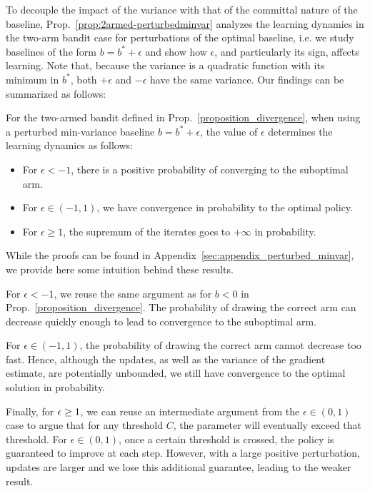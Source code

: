 To decouple the impact of the variance with that of the committal nature of the baseline, Prop.~\ref{prop:2armed-perturbedminvar} analyzes the learning dynamics in the two-arm bandit case for perturbations of the optimal baseline, i.e. we study baselines of the form $b = b^* + \epsilon$ and show how $\epsilon$, and particularly its sign, affects learning. Note that, because the variance is a quadratic function with its minimum in $b^*$, both $+\epsilon$ and $-\epsilon$ have the same variance. Our findings can be summarized as follows:
\begin{proposition}
    \label{prop:2armed-perturbedminvar}
    For the two-armed bandit defined in Prop.~\ref{proposition_divergence}, when using a perturbed min-variance baseline $b = b^* + \epsilon$, the value of $\epsilon$ determines the learning dynamics as follows:
    \begin{itemize}%
        \item For $\epsilon < -1$, there is a positive probability of converging to the suboptimal arm.
        \item For $\epsilon \in (-1, 1)$, we have convergence in probability to the optimal policy.
        \item For $\epsilon \ge 1$, the supremum of the iterates goes to $+\infty$ in probability.
    \end{itemize}
\end{proposition}


While the proofs can be found in Appendix~\ref{sec:appendix_perturbed_minvar}, we provide here some intuition behind these results.

For $\epsilon < -1$, we reuse the same argument as for $b<0$ in Prop.~\ref{proposition_divergence}. The probability of drawing the correct arm can decrease quickly enough to lead to convergence to the suboptimal arm.

For $\epsilon \in (-1,1)$, the probability of drawing the correct arm cannot decrease too fast. Hence, although the updates, as well as the variance of the gradient estimate, are potentially unbounded, we still have convergence to the optimal solution in probability.

Finally, for ${\epsilon} \ge 1$, we can reuse an intermediate argument from the $\epsilon \in (0,1)$ case to argue that for any threshold $C$, the parameter will eventually exceed that threshold. For $\epsilon \in (0,1)$, once a certain threshold is crossed, the policy is guaranteed to improve at each step. However, with a large positive perturbation, updates are larger and we lose this additional guarantee, leading to the weaker result.

